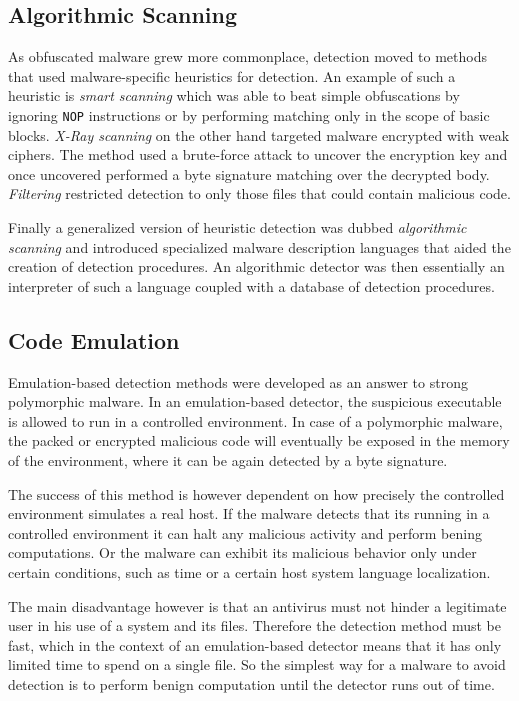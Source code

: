 \subsection{Algorithmic Scanning}
As obfuscated malware grew more commonplace, detection moved to methods that used malware-specific heuristics for detection. An example of such a heuristic is \emph{smart scanning} which was able to beat simple obfuscations by ignoring \texttt{NOP} instructions or by performing matching only in the scope of basic blocks. \emph{X-Ray scanning} on the other hand targeted malware encrypted with weak ciphers. The method used a brute-force attack to uncover the encryption key and once uncovered performed a byte signature matching over the decrypted body. \emph{Filtering} restricted detection to only those files that could contain malicious code.

Finally a generalized version of heuristic detection was dubbed \emph{algorithmic scanning} and introduced specialized malware description languages that aided the creation of detection procedures. An algorithmic detector was then essentially an interpreter of such a language coupled with a database of detection procedures.

\subsection{Code Emulation}
Emulation-based detection methods were developed as an answer to strong polymorphic malware. In an emulation-based detector, the suspicious executable is allowed to run in a controlled environment. In case of a polymorphic malware, the packed or encrypted malicious code will eventually be exposed in the memory of the environment, where it can be again detected by a byte signature.

The success of this method is however dependent on how precisely the controlled environment simulates a real host. If the malware detects that its running in a controlled environment it can halt any malicious activity and perform bening computations. Or the malware can exhibit its malicious behavior only under certain conditions, such as time or a certain host system language localization.

The main disadvantage however is that an antivirus must not hinder a legitimate user in his use of a system and its files. Therefore the detection method must be fast, which in the context of an emulation-based detector means that it has only limited time to spend on a single file. So the simplest way for a malware to avoid detection is to perform benign computation until the detector runs out of time.

